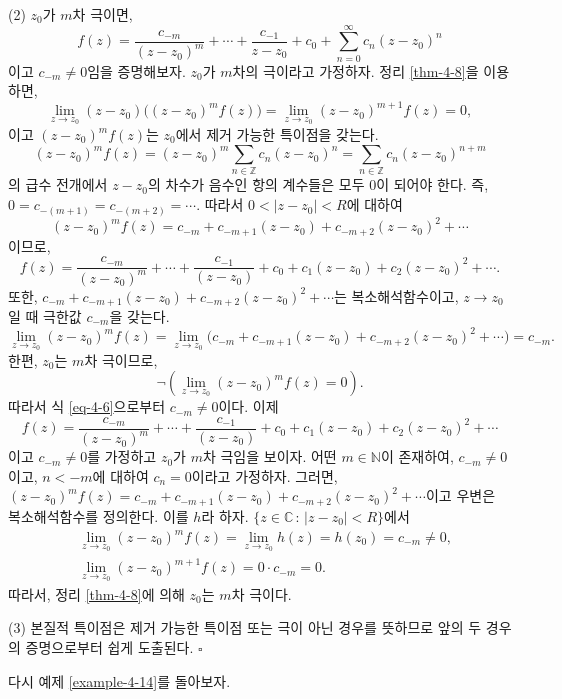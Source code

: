 (2) $z_0$가 $m$차 극이면,
\[
f(z) = \dfrac{c_{-m}}{(z-z_0)^m} + \cdots + \dfrac{c_{-1}}{z-z_0}
+ c_0 + \sum_{n=0}^\infty c_n(z-z_0)^n
\]
이고 $c_{-m} \ne 0$임을 증명해보자.
$z_0$가 $m$차의 극이라고 가정하자.
정리 \ref{thm-4-8}을 이용하면,
\[
\lim_{z\to z_0} (z-z_0)\Big( (z-z_0)^m f(z) \Big)
= \lim_{z\to z_0} (z-z_0)^{m+1} f(z) =0,
\]
이고 $(z-z_0)^m f(z)$는 $z_0$에서 제거 가능한 특이점을 갖는다.
\[
(z-z_0)^mf(z) = (z-z_0)^m \sum_{n\in\mathbb Z}c_n(z-z_0)^n
= \sum_{n\in\mathbb Z}c_n(z-z_0)^{n+m}
\]
의 급수 전개에서 $z-z_0$의 차수가 음수인 항의 계수들은 모두 $0$이 되어야 한다.
즉, $0 = c_{-(m+1)} = c_{-(m+2)} = \cdots$.
따라서 $0<|z-z_0|<R$에 대하여
\begin{equation}\label{eq-4-6}
(z-z_0)^mf(z) = c_{-m} + c_{-m+1}(z-z_0) + c_{-m+2}(z-z_0)^2 + \cdots
\end{equation}
이므로,
\[
f(z) = \dfrac{c_{-m}}{(z-z_0)^m} + \cdots + \dfrac{c_{-1}}{(z-z_0)}
+ c_0 + c_1(z-z_0) + c_2(z-z_0)^2 + \cdots.
\]
또한, 
$c_{-m} + c_{-m+1}(z-z_0) + c_{-m+2}(z-z_0)^2 + \cdots$는 
복소해석함수이고, $z\to z_0$일 때 극한값 $c_{-m}$을 갖는다.
\[
\lim_{z\to z_0} (z-z_0)^mf(z) 
= \lim_{z\to z_0}  \Big( 
c_{-m} + c_{-m+1}(z-z_0) + c_{-m+2}(z-z_0)^2 + \cdots \Big) = c_{-m}.
\]
한편, $z_0$는 $m$차 극이므로, 
\[
\neg \left( \lim_{z\to z_0} (z-z_0)^mf(z) =0 \right).
\]
따라서 식 \eqref{eq-4-6}으로부터 $c_{-m} \ne 0$이다. 이제 
\[
f(z) = \dfrac{c_{-m}}{(z-z_0)^m} + \cdots + \dfrac{c_{-1}}{(z-z_0)}
+ c_0 + c_1(z-z_0) + c_2(z-z_0)^2 + \cdots
\]
이고 $c_{-m} \ne 0$를 가정하고 $z_0$가 $m$차 극임을 보이자.
어떤 $m\in \mathbb N$이 존재하여,
$c_{-m} \ne 0$이고, $n<-m$에 대하여 $c_n=0$이라고 가정하자.
그러면, 
$(z-z_0)^mf(z) = c_{-m} + c_{-m+1}(z-z_0) + c_{-m+2}(z-z_0)^2 + \cdots$이고
우변은 복소해석함수를 정의한다. 이를 $h$라 하자.
$\{z \in \mathbb C\,:\, |z-z_0| <R\}$에서
\begin{align*}
& \lim_{z\to z_0} (z-z_0)^m f(z) = \lim_{z\to z_0} h(z) = h(z_0) = c_{-m} \ne0,\\
& \lim_{z\to z_0} (z-z_0)^{m+1}f(z) = 0 \cdot c_{-m} = 0.
\end{align*}
따라서, 정리 \ref{thm-4-8}에 의해 $z_0$는 $m$차 극이다.

(3) 본질적 특이점은 제거 가능한 특이점 또는 극이 아닌 경우를 뜻하므로 
앞의 두 경우의 증명으로부터 쉽게 도출된다.
\hfill $\square$

다시 예제 \ref{example-4-14}를 돌아보자.

